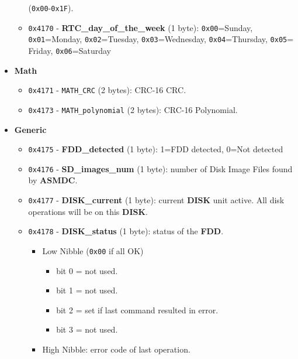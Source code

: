 \begin{itemize}
\begin{itemize}
                (\texttt{0x00}-\texttt{0x1F}).
                \item \texttt{0x4170} - \textbf{RTC\_day\_of\_the\_week} (1 byte):
                \texttt{0x00}=Sunday, \texttt{0x01}=Monday, \texttt{0x02}=Tuesday,
                \texttt{0x03}=Wednesday, \texttt{0x04}=Thursday, \texttt{0x05}=
                Friday, \texttt{0x06}=Saturday
            \end{itemize}
            \item \textbf{Math}
            \begin{itemize}
                \item \texttt{0x4171} - \texttt{MATH\_CRC} (2 bytes): CRC-16 CRC.
                \item \texttt{0x4173} - \texttt{MATH\_polynomial} (2 bytes): CRC-16
                Polynomial.
            \end{itemize}
            \item \textbf{Generic}
            \begin{itemize}
                \item \texttt{0x4175} - \textbf{FDD\_detected} (1 byte): 
                1=FDD detected, 0=Not detected
                \item \texttt{0x4176} - \textbf{SD\_images\_num} (1 byte): number
                of Disk Image Files found by \textbf{ASMDC}.
                \item \texttt{0x4177} - \textbf{DISK\_current} (1 byte): current 
                \textbf{DISK} unit active. All disk operations will be on this
                \textbf{DISK}.
                \item \texttt{0x4178} - \textbf{DISK\_status} (1 byte): status of
                the \textbf{FDD}.
                \begin{itemize}
                    \item Low Nibble (\texttt{0x00} if all OK)
                    \begin{itemize}
                        \item bit 0 = not used.
                        \item bit 1 = not used.
                        \item bit 2 = set if last command resulted in error.
                        \item bit 3 = not used.
                    \end{itemize}
                    \item High Nibble: error code of last operation.

\end{itemize}
\end{itemize}
\end{itemize}
